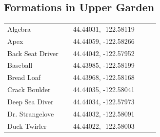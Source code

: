 \begin{flushleft}
\subsection{Formations in Upper Garden}
\begin{center}
\begin{supertabular}{p{0.38\linewidth}p{0.5\linewidth}}
Algebra & 44.44031, -122.58119 \\
Apex & 44.44059, -122.58266 \\
Back Seat Driver & 44.44042, -122.57952 \\
Baseball & 44.43985, -122.58199 \\
Bread Loaf & 44.43968, -122.58168 \\
Crack Boulder & 44.44035, -122.58041 \\
Deep Sea Diver & 44.44034, -122.57973 \\
Dr. Strangelove & 44.44032, -122.58091 \\
Duck Twirler & 44.44022, -122.58003 \\

\end{supertabular}
\end{center}
\end{flushleft}
